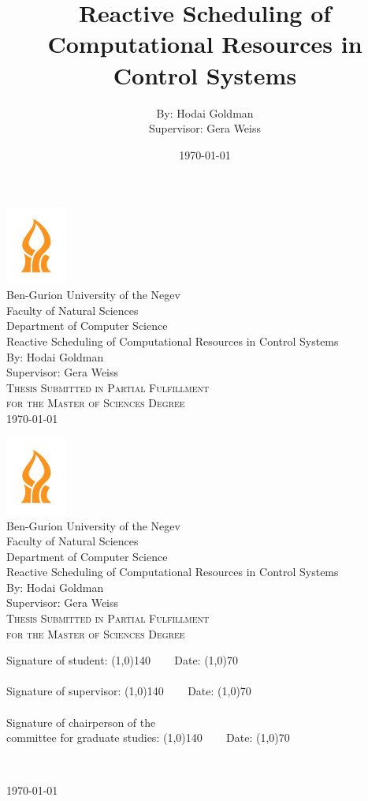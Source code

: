 \documentclass[ twoside, 12pt ]{article}
\title{
    \LARGE Reactive Scheduling of Computational Resources in Control Systems
}
\author{ By: \Large{Hodai Goldman} \\ \vspace{1cm}
    Supervisor: \Large{Gera Weiss} }
\date{\printdayoff\today}
\def\mydepartment{
    {\large Ben-Gurion University of the Negev\\
        Faculty of Natural Sciences \\
        Department of Computer Science} \\
}
\def\myauthor{Hodai Goldman} %
\def\mysupervisor{Gera Weiss} %
\def\mytitle{ {\Huge Reactive Scheduling of Computational Resources in Control Systems} } %
\def\mysubtitle{By: {\Large \myauthor} \\
    Supervisor: {\Large \mysupervisor}\\}
\def\mysubject{ \textsc{Thesis Submitted in Partial Fulfillment \\ for the Master of Sciences Degree} }
\def\myTitlePage{
    \includegraphics[width=0.15\textwidth]{BGU-logo.png} \\
    \mydepartment
    \vfill %
    \mytitle \\
    \vspace{1cm}
    \mysubtitle
    \vfill %
    \mysubject \\
}
\def\myfill{\hfill \line(1,0){140} ~~~ Date: \line(1,0){70} ~~~~~~~~ }
\def\mySignature{
    \begin{minipage}{1\textwidth}
        \begin{flushleft}
            Signature of student: \myfill \\ ~ \\
            Signature of supervisor: \myfill \\ ~ \\
            Signature of chairperson of the\\
            committee for graduate studies: \myfill
        \end{flushleft}
    \end{minipage}
}
\begin{document}
\begin{titlepage}
    \begin{center} 
        \myTitlePage
        \vspace{2cm}
        \printdayoff\today 
    \end{center} 

\end{titlepage}

\begin{titlepage}
    \hspace{3cm}
\end{titlepage}

\begin{titlepage}
    \begin{center} 
        \myTitlePage
        
        \vspace{2cm}
        \mySignature \\
        \vspace{1cm}
        
        \printdayoff\today 
    \end{center} 
    
\end{titlepage}


\begin{titlepage}
    \hspace{3cm}
\end{titlepage}

\newpage


\newpage


\newpage
\tableofcontents
\newpage
\listoffigures
\newpage

\end{document}
